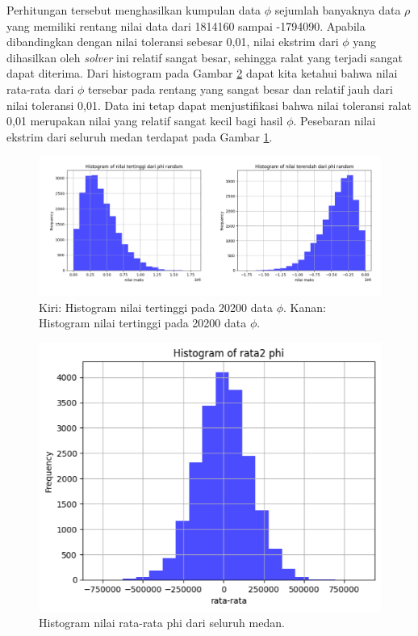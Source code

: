 Perhitungan tersebut menghasilkan kumpulan data $\phi$ sejumlah banyaknya data $\rho$ yang memiliki rentang nilai data dari 1814160 sampai -1794090. Apabila dibandingkan dengan nilai toleransi sebesar 0,01, nilai ekstrim dari $\phi$ yang dihasilkan oleh \textit{solver} ini  relatif sangat besar, sehingga ralat yang terjadi sangat dapat diterima. Dari histogram pada Gambar \ref{hist_rata2phi} dapat kita ketahui bahwa nilai rata-rata dari $\phi$ tersebar pada rentang yang sangat besar dan relatif jauh dari nilai toleransi 0,01. Data ini tetap dapat menjustifikasi bahwa nilai toleransi ralat 0,01 merupakan nilai yang relatif sangat kecil bagi hasil $\phi$. Pesebaran nilai ekstrim dari seluruh medan terdapat pada Gambar \ref{phi_gs_rendah_tinggi}.
\begin{figure}[h!]
    \centering
    \includegraphics[width=12cm]{gambar/phi_gs_rendah_tinggi.png}
    \caption{Kiri: Histogram nilai tertinggi pada 20200 data $\phi$. Kanan: Histogram nilai tertinggi pada 20200 data $\phi$.}
    \label{phi_gs_rendah_tinggi}
\end{figure}

\begin{figure}[h!]
    \centering
    \includegraphics[width=12cm]{gambar/hist_rata2phi.png}
    \caption{Histogram nilai rata-rata phi dari seluruh medan.}
    \label{hist_rata2phi}
\end{figure}

